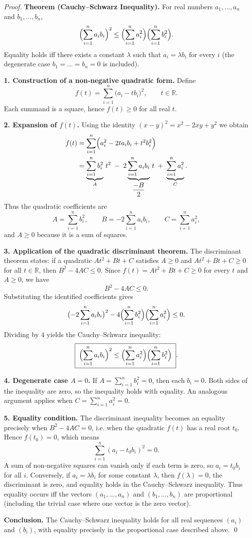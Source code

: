 \begin{proof}
\textbf{Theorem (Cauchy–Schwarz Inequality).}  
For real numbers $a_{1},\dots ,a_{n}$ and $b_{1},\dots ,b_{n}$,
\[
\Bigl(\sum_{i=1}^{n} a_{i}b_{i}\Bigr)^{2}\le
\Bigl(\sum_{i=1}^{n} a_{i}^{2}\Bigr)\Bigl(\sum_{i=1}^{n} b_{i}^{2}\Bigr).
\]
Equality holds iff there exists a constant $\lambda$ such that $a_{i}= \lambda b_{i}$ for every $i$ (the degenerate case $b_{1}= \dots =b_{n}=0$ is included).

\medskip
\textbf{1. Construction of a non‑negative quadratic form.}  
Define
\[
f(t)=\sum_{i=1}^{n}\bigl(a_{i}-t b_{i}\bigr)^{2},\qquad t\in\mathbb{R}.
\]
Each summand is a square, hence $f(t)\ge0$ for all real $t$.

\medskip
\textbf{2. Expansion of $f(t)$.}  
Using the identity $(x-y)^{2}=x^{2}-2xy+y^{2}$ we obtain
\begin{align*}
f(t)
&=\sum_{i=1}^{n}\Bigl(a_{i}^{2}-2t a_{i}b_{i}+t^{2}b_{i}^{2}\Bigr)\\
&=\underbrace{\sum_{i=1}^{n} b_{i}^{2}}_{A}\,t^{2}
   \;-\;2\underbrace{\sum_{i=1}^{n} a_{i}b_{i}}_{\displaystyle \frac{-B}{2}}\,t
   \;+\;\underbrace{\sum_{i=1}^{n} a_{i}^{2}}_{C}.
\end{align*}
Thus the quadratic coefficients are
\[
A=\sum_{i=1}^{n} b_{i}^{2},\qquad
B=-2\sum_{i=1}^{n} a_{i}b_{i},\qquad
C=\sum_{i=1}^{n} a_{i}^{2},
\]
and $A\ge0$ because it is a sum of squares.

\medskip
\textbf{3. Application of the quadratic discriminant theorem.}  
The discriminant theorem states: if a quadratic $A t^{2}+B t+C$ satisfies $A\ge0$ and $A t^{2}+B t+C\ge0$ for all $t\in\mathbb{R}$, then $B^{2}-4AC\le0$.  
Since $f(t)=A t^{2}+B t+C\ge0$ for every $t$ and $A\ge0$, we have
\[
B^{2}-4AC\le0.
\]
Substituting the identified coefficients gives
\[
\bigl(-2\sum_{i=1}^{n} a_{i}b_{i}\bigr)^{2}
   -4\Bigl(\sum_{i=1}^{n} b_{i}^{2}\Bigr)
        \Bigl(\sum_{i=1}^{n} a_{i}^{2}\Bigr)\le0.
\]
Dividing by $4$ yields the Cauchy–Schwarz inequality:
\[
\boxed{\;
\Bigl(\sum_{i=1}^{n} a_{i}b_{i}\Bigr)^{2}
\le
\Bigl(\sum_{i=1}^{n} a_{i}^{2}\Bigr)
   \Bigl(\sum_{i=1}^{n} b_{i}^{2}\Bigr)\; }.
\]

\medskip
\textbf{4. Degenerate case $A=0$.}  
If $A=\sum_{i=1}^{n} b_{i}^{2}=0$, then each $b_{i}=0$. Both sides of the inequality are zero, so the inequality holds with equality. An analogous argument applies when $C=\sum_{i=1}^{n} a_{i}^{2}=0$.

\medskip
\textbf{5. Equality condition.}  
The discriminant inequality becomes an equality precisely when $B^{2}-4AC=0$, i.e. when the quadratic $f(t)$ has a real root $t_{0}$. Hence $f(t_{0})=0$, which means
\[
\sum_{i=1}^{n}(a_{i}-t_{0}b_{i})^{2}=0.
\]
A sum of non‑negative squares can vanish only if each term is zero, so $a_{i}=t_{0}b_{i}$ for all $i$. Conversely, if $a_{i}=\lambda b_{i}$ for some constant $\lambda$, then $f(\lambda)=0$, the discriminant is zero, and equality holds in the Cauchy–Schwarz inequality. Thus equality occurs iff the vectors $(a_{1},\dots ,a_{n})$ and $(b_{1},\dots ,b_{n})$ are proportional (including the trivial case where one vector is the zero vector).

\medskip
\textbf{Conclusion.}  
The Cauchy–Schwarz inequality holds for all real sequences $(a_i)$ and $(b_i)$, with equality precisely in the proportional case described above. \qed
\end{proof}
